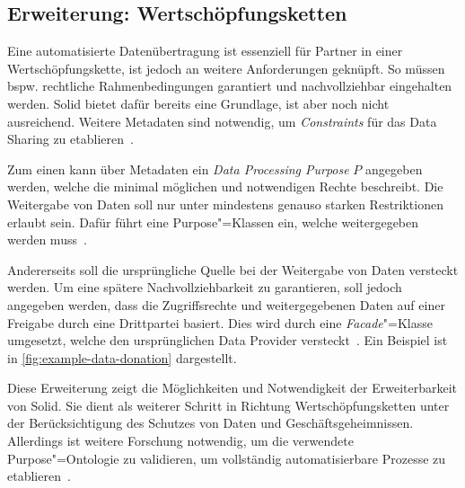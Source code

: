\subsection{Erweiterung: Wertschöpfungsketten}

Eine automatisierte Datenübertragung ist essenziell für Partner in einer Wertschöpfungskette, ist jedoch an weitere Anforderungen geknüpft.
So müssen bspw. rechtliche Rahmenbedingungen garantiert und nachvollziehbar eingehalten werden.
Solid bietet dafür bereits eine Grundlage, ist aber noch nicht ausreichend.
Weitere Metadaten sind notwendig, um \emph{Constraints} für das Data Sharing zu etablieren~\cite{bothSolidBasedB2BData2025}.

Zum einen kann über Metadaten ein \emph{Data Processing Purpose} $P$ angegeben werden, welche die minimal möglichen und notwendigen Rechte beschreibt.
Die Weitergabe von Daten soll nur unter mindestens genauso starken Restriktionen erlaubt sein.
Dafür führt \cite{bothSolidBasedB2BData2025} eine Purpose"=Klassen ein, welche weitergegeben werden muss~\cite{bothSolidBasedB2BData2025}.

Andererseits soll die ursprüngliche Quelle bei der Weitergabe von Daten versteckt werden.
Um eine spätere Nachvollziehbarkeit zu garantieren, soll jedoch angegeben werden, dass die Zugriffsrechte und weitergegebenen Daten auf einer Freigabe durch eine Drittpartei basiert.
Dies wird durch eine \emph{Facade}"=Klasse umgesetzt, welche den ursprünglichen Data Provider versteckt~\cite{bothSolidBasedB2BData2025}. Ein Beispiel ist in \autoref{fig:example-data-donation} dargestellt.

Diese Erweiterung zeigt die Möglichkeiten und Notwendigkeit der Erweiterbarkeit von Solid.
Sie dient als weiterer Schritt in Richtung Wertschöpfungsketten unter der Berücksichtigung des Schutzes von Daten und Geschäftsgeheimnissen.
Allerdings ist weitere Forschung notwendig, um die verwendete Purpose"=Ontologie zu validieren, um vollständig automatisierbare Prozesse zu etablieren~\cite{bothSolidBasedB2BData2025}.

